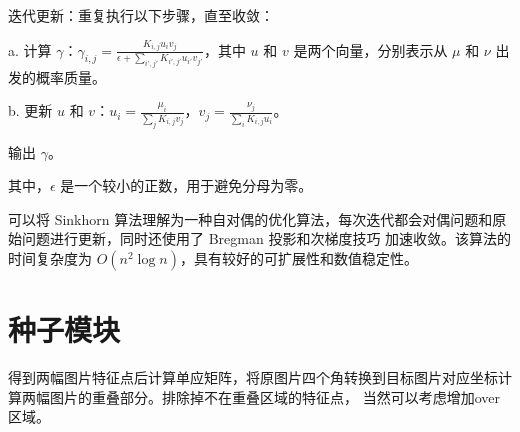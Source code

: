 \documentclass[10pt]{article}
\begin{document}
迭代更新：重复执行以下步骤，直至收敛：

a. 计算 $\gamma$：$\gamma_{i,j}=\frac{K_{i,j}u_i v_j}{\epsilon+\sum_{i',j'}K_{i',j'}u_{i'}v_{j'}}$，其中 $u$ 和
 $v$ 是两个向量，分别表示从 $\mu$ 和 $\nu$ 出发的概率质量。

b. 更新 $u$ 和 $v$：$u_i=\frac{\mu_i}{\sum_j K_{i,j}v_j}$，$v_j=\frac{\nu_j}{\sum_i K_{i,j}u_i}$。

输出 $\gamma$。

其中，$\epsilon$ 是一个较小的正数，用于避免分母为零。

可以将 Sinkhorn 算法理解为一种自对偶的优化算法，每次迭代都会对偶问题和原始问题进行更新，同时还使用了 Bregman 投影和次梯度技巧
加速收敛。该算法的时间复杂度为 $O(n^2\log n)$，具有较好的可扩展性和数值稳定性。
\section{种子模块}
\indent 得到两幅图片特征点后计算单应矩阵，将原图片四个角转换到目标图片对应坐标计算两幅图片的重叠部分。排除掉不在重叠区域的特征点，
当然可以考虑增加over区域。
\end{document}

